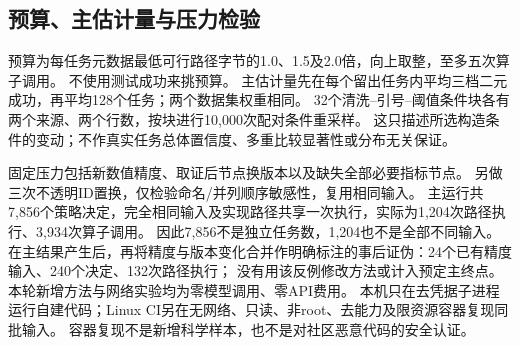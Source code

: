 \subsection{预算、主估计量与压力检验}
预算为每任务元数据最低可行路径字节的1.0、1.5及2.0倍，向上取整，至多五次算子调用。
不使用测试成功来挑预算。
主估计量先在每个留出任务内平均三档二元成功，再平均128个任务；两个数据集权重相同。
32个清洗--引号--阈值条件块各有两个来源、两个行数，按块进行10,000次配对条件重采样。
这只描述所选构造条件的变动；不作真实任务总体置信度、多重比较显著性或分布无关保证。

固定压力包括新数值精度、取证后节点换版本以及缺失全部必要指标节点。
另做三次不透明ID置换，仅检验命名/并列顺序敏感性，复用相同输入。
主运行共7,856个策略决定，完全相同输入及实现路径共享一次执行，实际为1,204次路径执行、3,934次算子调用。
因此7,856不是独立任务数，1,204也不是全部不同输入。
在主结果产生后，再将精度与版本变化合并作明确标注的事后证伪：24个已有精度输入、240个决定、132次路径执行；
没有用该反例修改方法或计入预定主终点。
本轮新增方法与网络实验均为零模型调用、零API费用。
本机只在去凭据子进程运行自建代码；Linux CI另在无网络、只读、非root、去能力及限资源容器复现同批输入。
容器复现不是新增科学样本，也不是对社区恶意代码的安全认证。
